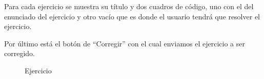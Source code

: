 \vspace{1em}

Para cada ejercicio se muestra su título y dos cuadros de código, uno con el del enunciado del ejercicio y otro vacío que es donde el usuario tendrá que resolver el ejercicio.

\vspace{1em}

Por último está el botón de ``Corregir'' con el cual enviamos el ejercicio a ser corregido.

\begin{figure}[H]
\begin{center}
\caption{Ejercicio\label{fig:ejercicio}}
\end{center}
\end{figure}

